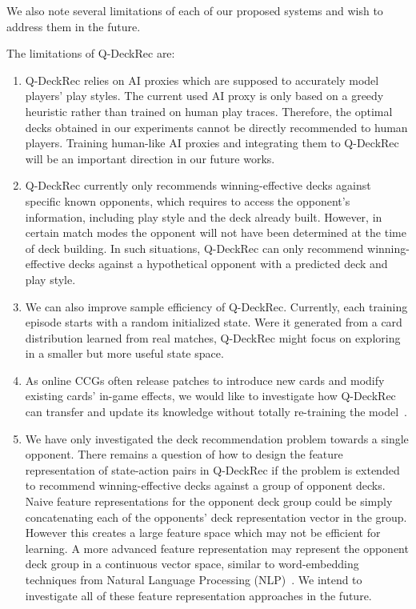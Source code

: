 We also note several limitations of each of our proposed systems and wish to address them in the future. 

The limitations of Q-DeckRec are: 
\begin{enumerate}
\item Q-DeckRec relies on AI proxies which are supposed to accurately model players' play styles. The current used AI proxy is only based on a greedy heuristic rather than trained on human play traces. Therefore, the optimal decks obtained in our experiments cannot be directly recommended to human players. Training human-like AI proxies and integrating them to Q-DeckRec will be an important direction in our future works. 

\item Q-DeckRec currently only recommends winning-effective decks against specific known opponents, which requires to access the opponent's information, including play style and the deck already built. However, in certain match modes the opponent will not have been determined at the time of deck building. In such situations, Q-DeckRec can only recommend winning-effective decks against a hypothetical opponent with a predicted deck and play style.


\item We can also improve sample efficiency of Q-DeckRec. Currently, each training episode starts with a random initialized state. Were it generated from a card distribution learned from real matches, Q-DeckRec might focus on exploring in a smaller but more useful state space. 

\item As online CCGs often release patches to introduce new cards and modify existing cards' in-game effects, we would like to investigate how Q-DeckRec can transfer and update its knowledge without totally re-training the model~\cite{taylor2009transfer}.

\item We have only investigated the deck recommendation problem towards a single opponent. There remains a question of how to design the feature representation of state-action pairs in Q-DeckRec if the problem is extended to recommend winning-effective decks against a group of opponent decks. Naive feature representations for the opponent deck group could be simply concatenating each of the opponents' deck representation vector in the group. However this creates a large feature space which may not be efficient for learning. A more advanced feature representation may represent the opponent deck group in a continuous vector space, similar to word-embedding techniques from Natural Language Processing (NLP)~\cite{mikolov2013distributed}. We intend to investigate all of these feature representation approaches in the future.
\end{enumerate}

